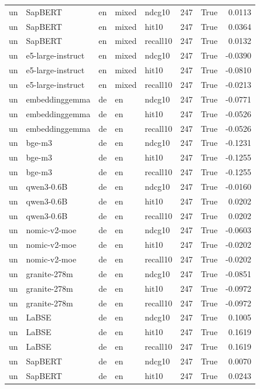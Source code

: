 \begin{tabular}{lllllrrr}
un & SapBERT & en & mixed & ndcg10 & 247 & True & 0.0113 \\
un & SapBERT & en & mixed & hit10 & 247 & True & 0.0364 \\
un & SapBERT & en & mixed & recall10 & 247 & True & 0.0132 \\
un & e5-large-instruct & en & mixed & ndcg10 & 247 & True & -0.0390 \\
un & e5-large-instruct & en & mixed & hit10 & 247 & True & -0.0810 \\
un & e5-large-instruct & en & mixed & recall10 & 247 & True & -0.0213 \\
un & embeddinggemma & de & en & ndcg10 & 247 & True & -0.0771 \\
un & embeddinggemma & de & en & hit10 & 247 & True & -0.0526 \\
un & embeddinggemma & de & en & recall10 & 247 & True & -0.0526 \\
un & bge-m3 & de & en & ndcg10 & 247 & True & -0.1231 \\
un & bge-m3 & de & en & hit10 & 247 & True & -0.1255 \\
un & bge-m3 & de & en & recall10 & 247 & True & -0.1255 \\
un & qwen3-0.6B & de & en & ndcg10 & 247 & True & -0.0160 \\
un & qwen3-0.6B & de & en & hit10 & 247 & True & 0.0202 \\
un & qwen3-0.6B & de & en & recall10 & 247 & True & 0.0202 \\
un & nomic-v2-moe & de & en & ndcg10 & 247 & True & -0.0603 \\
un & nomic-v2-moe & de & en & hit10 & 247 & True & -0.0202 \\
un & nomic-v2-moe & de & en & recall10 & 247 & True & -0.0202 \\
un & granite-278m & de & en & ndcg10 & 247 & True & -0.0851 \\
un & granite-278m & de & en & hit10 & 247 & True & -0.0972 \\
un & granite-278m & de & en & recall10 & 247 & True & -0.0972 \\
un & LaBSE & de & en & ndcg10 & 247 & True & 0.1005 \\
un & LaBSE & de & en & hit10 & 247 & True & 0.1619 \\
un & LaBSE & de & en & recall10 & 247 & True & 0.1619 \\
un & SapBERT & de & en & ndcg10 & 247 & True & 0.0070 \\
un & SapBERT & de & en & hit10 & 247 & True & 0.0243 \\

\end{tabular}
